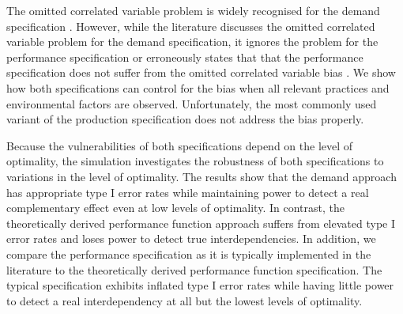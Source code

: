 \documentclass[12pt]{article}
\begin{document}
 The omitted correlated variable problem is widely recognised for the demand specification \citep{Grabner2013, Arora1996,Hofmann2015OrganizationalChoices}. However, while the literature discusses the omitted correlated variable problem for the demand specification, it ignores the problem for the performance specification \citep{Grabner2013,Hofmann2015OrganizationalChoices} or erroneously states that that the performance specification does not suffer from the omitted correlated variable bias \citep{Carree2011}.  We show how both specifications can control for the bias when all relevant practices and environmental factors are observed. Unfortunately, the most commonly used variant of the production specification does not address the bias properly.

Because the vulnerabilities of both specifications depend on the level of optimality, the simulation investigates the robustness of both specifications to variations in the level of optimality. The results show that the demand approach has appropriate type I error rates while maintaining power to detect a real complementary effect even at low levels of optimality. In contrast, the theoretically derived performance function approach suffers from elevated type I error rates and loses power to detect true interdependencies. In addition, we compare the performance specification as it is typically implemented in the literature to the theoretically derived performance function specification. The typical specification exhibits inflated type I error rates while having little power to detect a real interdependency at all but the lowest levels of optimality.
\end{document}
